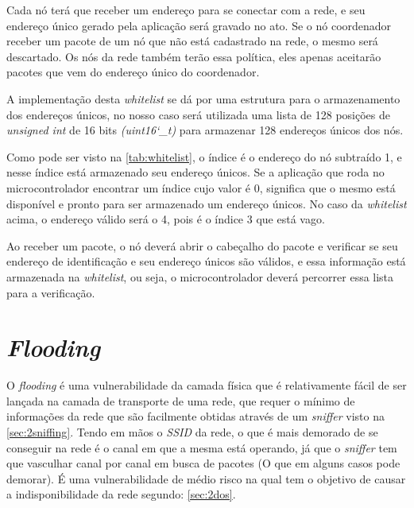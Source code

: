 \par Cada nó terá que receber um endereço para se conectar com a rede, e seu endereço \'unico gerado pela aplica\c{c}\~ao será gravado no ato. Se o nó coordenador receber um pacote de um nó que não está cadastrado na rede, o mesmo será descartado. Os n\'os da rede tamb\'em ter\~ao essa pol\'itica, eles apenas aceitar\~ao pacotes que vem do endere\c{c}o \'unico do coordenador.

\par A implementa\c{c}\~ao desta \emph{whitelist} se d\'a por uma estrutura para o armazenamento dos endere\c{c}os \'unicos, no nosso caso ser\'a utilizada uma lista de 128 posi\c{c}\~oes de \emph{unsigned int} de 16 bits \emph{(uint16\char`_t)} para armazenar 128 endereços \'unicos dos nós.


\par Como pode ser visto na \autoref{tab:whitelist}, o índice é o endereço do nó subtraído 1, e nesse índice está armazenado seu endereço \'unicos. Se a aplicação que roda no microcontrolador encontrar um índice cujo valor é 0, significa que o mesmo está disponível e pronto para ser armazenado um endereço \'unicos. No caso da \emph{whitelist} acima, o endere\c{c}o v\'alido ser\'a o 4, pois \'e o \'indice 3 que est\'a vago. 


\par Ao receber um pacote, o n\'o dever\'a abrir o cabe\c{c}alho do pacote e verificar se seu endere\c{c}o de identifica\c{c}\~ao e seu endere\c{c}o \'unicos s\~ao v\'alidos, e essa informa\c{c}\~ao est\'a armazenada na \emph{whitelist}, ou seja, o microcontrolador dever\'a percorrer essa lista para a verifica\c{c}\~ao.


\section{\emph{Flooding}}
\label{sec:3flooding}
\par O \emph{flooding} é uma vulnerabilidade da camada física que é relativamente fácil de ser lançada na camada de transporte de uma rede, que requer o mínimo de informações da rede que são facilmente obtidas através de um \emph{sniffer} visto na \autoref{sec:2sniffing}. Tendo em mãos o \emph{SSID} da rede, o que é mais demorado de se conseguir na rede é o canal em que a mesma está operando, já que o \emph{sniffer} tem que vasculhar canal por canal em busca de pacotes (O que em alguns casos pode demorar). \'E uma vulnerabilidade de m\'edio risco na qual tem o objetivo de causar a indisponibilidade da rede segundo: \autoref{sec:2dos}.

